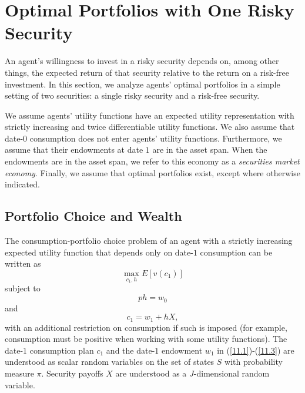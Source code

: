 \documentclass[\topdir/lecture\_notes.tex]{subfiles}
\begin{document}
\section{Optimal Portfolios with One Risky Security}
An agent's willingness to invest in a risky security depends on, among other things, the expected return of that security relative to the return on a risk-free investment. In this section,  we analyze agents' optimal portfolios in a simple setting of two securities: a single risky security and a risk-free security.

We assume agents' utility functions have an expected utility representation with strictly increasing and twice differentiable utility functions. We also assume that date-\(0\) consumption does not enter agents' utility functions. Furthermore, we assume that their endowments at date \(1\) are in the asset span. When the endowments are in the asset span, we refer to this economy as a \emph{securities market economy}. Finally, we assume that optimal portfolios exist, except where otherwise indicated.

\subsection{Portfolio Choice and Wealth}
The consumption-portfolio choice problem of an agent with a strictly increasing expected utility function that depends only on date-\(1\) consumption can be written as
\begin{equation}
\max_{c_{1}, h} E[v(c_{1})] \label{eq:consumption_portfolio_problem} 
\end{equation}
subject to
\begin{equation}
p h=w_{0} \label{11.1}
\end{equation}
and
\begin{equation}
c_{1}=w_{1}+h X, \label{11.2}
\end{equation}
with an additional restriction on consumption if such is imposed (for example, consumption must be positive when working with some utility functions). The date-\(1\) consumption plan \(c_{1}\) and the date-\(1\) endowment \(w_{1}\) in (\ref{11.1})-(\ref{11.3}) are understood as scalar random variables on the set of states \(S\) with probability measure \(\pi\). Security payoffs \(X\) are understood as a \(J\)-dimensional random variable.
\end{document}
